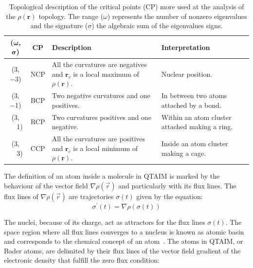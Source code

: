 \begin{table}[ht]
\caption{Topological description of the critical points (CP) more used at the
  analysis of the $\rho(\mathbf{r})$ topology. The range ($\omega$) represents
  the number of nonzero eigenvalues
  and the signature ($\sigma$)
  the algebraic sum of the eigenvalues signs.}
\begin{tabular}{c c m{7cm} m{5cm}}
  \textbf{($\mathbf{\omega}$, $\mathbf{\sigma}$)} & \textbf{\gls{CP}} & \textbf{Description} & \textbf{Interpretation}\\ \hline \hline
  (\num{3}, \num{-3}) & \gls{NCP} & All the curvatures are negatives and $\mathbf{r}_c$ is a local maximum of $\rho(\mathbf{r})$. & Nuclear position.\\ \hline
  (\num{3}, \num{-1}) & \gls{BCP} & Two negative curvatures and one positives. & In between two atoms attached by a bond.\\ \hline
  (\num{3}, $\phantom{-}$\num{+1}) & \gls{RCP} & Two curvatures positives and one negative. & Within an atom cluster attached making a ring.\\ \hline
  (\num{3}, $\phantom{-}$\num{+3}) & \gls{CCP} & All the curvatures are positives and  $\mathbf{r}_c$ is a local minimum of $\rho(\mathbf{r})$. & Inside an atom cluster making a cage.\\
  \hline
\end{tabular}
\label{PuntosCriticos}
\end{table}

\newpage

The definition of an atom inside a molecule in QTAIM is marked by the behaviour
of the vector field $\nabla\rho(\vec{r})$ and particularly with its flux lines.
The flux lines of $\nabla\rho(\vec{r})$ are trajectories $\sigma(t)$ given by
the equation:
\begin{equation}
  \sigma^{\prime}(t) = \nabla\rho\left( \sigma(t)\right) 
\label{fluxlines}
\end{equation}

The nuclei, because of its charge, act as attractors for the flux lines
$\sigma(t)$. The space region where all flux lines converges to a nucleus is
known as atomic basin and corresponds to the chemical concept of an
atom~\cite{bader}. The atoms in QTAIM, or Bader atoms, are delimited by their
flux lines of the vector field gradient of the electronic density that fulfill
the zero flux condition:

